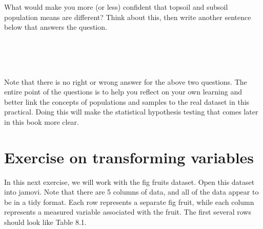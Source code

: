 \documentclass[
  openany]{krantz}
\begin{document}
What would make you more (or less) confident that topsoil and subsoil population means are different?
Think about this, then write another sentence below that answers the question.

\begin{verbatim}




\end{verbatim}

Note that there is no right or wrong answer for the above two questions.
The entire point of the questions is to help you reflect on your own learning and better link the concepts of populations and samples to the real dataset in this practical.
Doing this will make the statistical hypothesis testing that comes later in this book more clear.

\hypertarget{transforming_variables_02}{%
\section{Exercise on transforming variables}\label{transforming_variables_02}}

In this next exercise, we will work with the fig fruits dataset.
Open this dataset into jamovi.
Note that there are 5 columns of data, and all of the data appear to be in a tidy format.
Each row represents a separate fig fruit, while each column represents a measured variable associated with the fruit.
The first several rows should look like Table 8.1.
\end{document}
